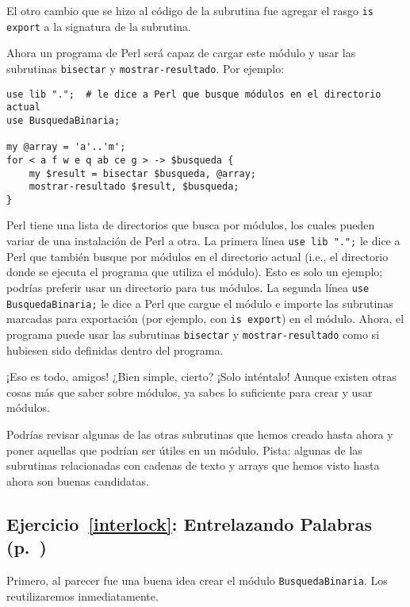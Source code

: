 El otro cambio que se hizo al código de la subrutina fue agregar el
rasgo {\tt is export} a la signatura de la subrutina.

Ahora un programa de Perl será capaz de cargar este módulo
y usar las subrutinas {\tt bisectar} y {\tt mostrar-resultado}.
Por ejemplo:
\begin{verbatim}
use lib ".";  # le dice a Perl que busque módulos en el directorio actual
use BusquedaBinaria;

my @array = 'a'..'m';
for < a f w e q ab ce g > -> $busqueda { 
    my $result = bisectar $busqueda, @array;
    mostrar-resultado $result, $busqueda;
}
\end{verbatim}
%

Perl tiene una lista de directorios que busca por módulos,
los cuales pueden variar de una instalación de Perl a otra.
La primera línea {\tt use lib ".";} le dice a Perl que también
busque por módulos en el directorio actual (i.e., el directorio
donde se ejecuta el programa que utiliza el módulo). Esto es
solo un ejemplo; podrías preferir usar un directorio para tus
módulos. La segunda línea {\tt use BusquedaBinaria;} le dice a
Perl que cargue el módulo e importe las subrutinas marcadas
para exportación (por ejemplo, con {\tt is export}) en el módulo.
Ahora, el programa puede usar las subrutinas {\tt bisectar}
y {\tt mostrar-resultado} como si hubiesen sido definidas dentro
del programa.

¡Eso es todo, amigos! ¿Bien simple, cierto? ¡Solo inténtalo!
Aunque existen otras cosas más que saber sobre módulos, ya sabes lo suficiente
para crear y usar módulos.

Podrías revisar algunas de las otras subrutinas que hemos
creado hasta ahora y poner aquellas que podrían ser útiles
en un módulo. Pista: algunas de las subrutinas relacionadas
con cadenas de texto y arrays que hemos visto hasta ahora
son buenas candidatas.

\subsection{Ejercicio~\ref{interlock}: Entrelazando Palabras (p.~\pageref{interlock})}


\label{sol_interlock}

Primero, al parecer fue una buena idea crear el módulo
\verb|BusquedaBinaria|. Los reutilizaremos inmediatamente.

